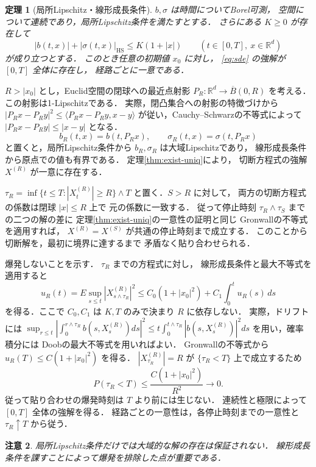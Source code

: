 \documentclass[a5paper,10pt,onecolumn]{jsarticle}
\makeatletter
\theoremstyle{mathnotetheorem}
\newtheorem{theorem}{定理}[section]
\newtheorem{remark}[theorem]{注意}
\renewcommand{\proofname}{証明}
\renewenvironment{proof}[1][\proofname]{%
  \par\pushQED{\qed}\normalfont\topsep4\p@\@plus2\p@\relax
  \trivlist\item[\hskip\labelsep\bfseries #1]\ignorespaces
}{\popQED\endtrivlist\@endpefalse}
\makeatother
\begin{document}
\begin{theorem}[局所Lipschitz・線形成長条件]\label{thm:local-global}
$b,\sigma$ は時間についてBorel可測，
空間について連続であり，局所Lipschitz条件を満たすとする．
さらにある $K\ge0$ が存在して
\[
 |b(t,x)|+|\sigma(t,x)|_{\mathrm{HS}}
 \le K(1+|x|)
 \qquad(t\in[0,T],\ x\in\mathbb R^d)
\]
が成り立つとする．
このとき任意の初期値 $x_0$ に対し，
\eqref{eq:sde} の強解が $[0,T]$ 全体に存在し，
経路ごとに一意である．
\end{theorem}
\begin{proof}
$R>|x_0|$ とし，Euclid空間の閉球への最近点射影
$P_R:\mathbb R^d\to\overline{B}(0,R)$ を考える．
この射影は1-Lipschitzである．
実際，閉凸集合への射影の特徴づけから
$|P_Rx-P_Ry|^2\le\langle P_Rx-P_Ry,x-y\rangle$
が従い，Cauchy--Schwarzの不等式によって
$|P_Rx-P_Ry|\le|x-y|$ となる．
\[
 b_R(t,x)=b(t,P_Rx),\qquad
 \sigma_R(t,x)=\sigma(t,P_Rx)
\]
と置くと，局所Lipschitz条件から
$b_R,\sigma_R$ は大域Lipschitzであり，
線形成長条件から原点での値も有界である．
定理\ref{thm:exist-uniq}により，
切断方程式の強解 $X^{(R)}$ が一意に存在する．

$\tau_R=\inf\{t\le T:|X_t^{(R)}|\ge R\}\wedge T$
と置く．$S>R$ に対して，
両方の切断方程式の係数は閉球 $|x|\le R$ 上で
元の係数に一致する．
従って停止時刻 $\tau_R\wedge\tau_S$ までの二つの解の差に
定理\ref{thm:exist-uniq}の一意性の証明と同じ
Gronwallの不等式を適用すれば，
$X^{(R)}=X^{(S)}$ が共通の停止時刻まで成立する．
このことから切断解を，最初に境界に達するまで
矛盾なく貼り合わせられる．

爆発しないことを示す．
$\tau_R$ までの方程式に対し，
線形成長条件と最大不等式を適用すると
\[
 u_R(t)=E\sup_{s\le t}|X^{(R)}_{s\wedge\tau_R}|^2
 \le C_0(1+|x_0|^2)
   +C_1\int_0^tu_R(s)\,ds
\]
を得る．ここで $C_0,C_1$ は $K,T$ のみで決まり
$R$ に依存しない．
実際，ドリフトには
$\sup_{r\le t}|\int_0^{r\wedge\tau_R}b(s,X_s^{(R)})ds|^2
 \le t\int_0^{t\wedge\tau_R}|b(s,X_s^{(R)})|^2ds$
を用い，確率積分には
Doobの最大不等式を用いればよい．
Gronwallの不等式から
$u_R(T)\le C(1+|x_0|^2)$ を得る．
$|X_{\tau_R}^{(R)}|=R$ が
$\{\tau_R<T\}$ 上で成立するため
\[
 P(\tau_R<T)\le \frac{C(1+|x_0|^2)}{R^2}
 \longrightarrow0.
\]
従って貼り合わせの爆発時刻は $T$ より前には生じない．
連続性と極限によって $[0,T]$ 全体の強解を得る．
経路ごとの一意性は，各停止時刻までの一意性と
$\tau_R\uparrow T$ から従う．
\end{proof}

\begin{remark}
局所Lipschitz条件だけでは大域的な解の存在は保証されない．
線形成長条件を課すことによって爆発を排除した点が重要である．
\end{remark}
\end{document}
